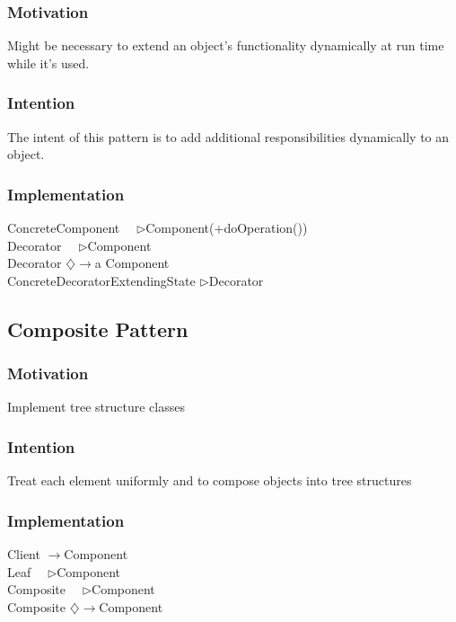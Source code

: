 \documentclass[a4paper]{scrartcl}
\newcommand{\aggregates}{$\diamondsuit\rightarrow $}
\newcommand{\implements}{\textendash ~\textendash ~\textendash$\triangleright$}
\newcommand{\extends}{\textendash\textendash\textendash$\triangleright$}
\newcommand{\uses}{$\longrightarrow$}
\begin{document}
      \subsubsection {Motivation}
        Might be necessary to extend an object's functionality dynamically at run time while it's used.
      \subsubsection {Intention }
        The intent of this pattern is to add additional responsibilities dynamically to an object.
      \subsubsection{Implementation}
        ConcreteComponent \implements Component(+doOperation())\\
        Decorator \implements Component\\
        Decorator \aggregates a Component\\
        ConcreteDecoratorExtendingState \extends Decorator\\
        
        
    \subsection { Composite Pattern}
      \subsubsection {Motivation}
        Implement tree structure classes
      \subsubsection {Intention }
        Treat each element uniformly and to compose objects into tree structures
      \subsubsection{Implementation}
        Client \uses Component\\
        Leaf \implements Component \\
        Composite \implements Component \\
        Composite \aggregates Component \\
        
        
\end{document}

